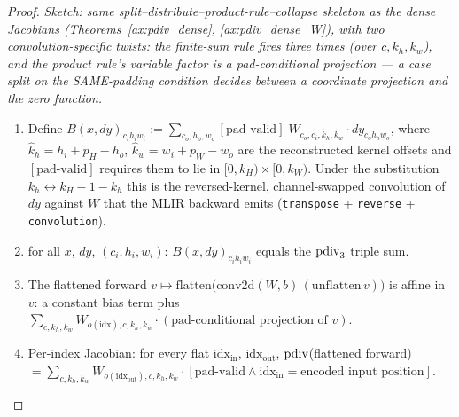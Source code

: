 \begin{proof}
\leanok
\emph{Sketch: same split--distribute--product-rule--collapse skeleton
as the dense Jacobians (Theorems~\ref{ax:pdiv_dense},
\ref{ax:pdiv_dense_W}), with two convolution-specific twists: the
finite-sum rule fires three times (over \(c, k_h, k_w\)), and the
product rule's variable factor is a pad-conditional projection
--- a case split on the SAME-padding condition decides between a
coordinate projection and the zero function.}
\begin{enumerate}
  \item Define \(B(x, dy)_{c_i h_i w_i} :=
    \sum_{c_o, h_o, w_o} [\text{pad-valid}]\;
      W_{c_o, c_i, \hat{k}_h, \hat{k}_w} \cdot dy_{c_o h_o w_o}\),
    where \(\hat{k}_h = h_i + p_H - h_o\),
    \(\hat{k}_w = w_i + p_W - w_o\) are the reconstructed kernel
    offsets and \([\text{pad-valid}]\) requires them to lie in
    \([0, k_H) \times [0, k_W)\). Under the substitution
    \(k_h \leftrightarrow k_H - 1 - k_h\) this is the reversed-kernel,
    channel-swapped convolution of \(dy\) against \(W\) that the MLIR
    backward emits (\texttt{transpose} + \texttt{reverse} +
    \texttt{convolution}).
  \item \Suffices{} for all \(x\), \(dy\), \((c_i, h_i, w_i)\):
    \(B(x, dy)_{c_i h_i w_i}\) equals the \(\operatorname{pdiv}_3\) triple sum.
  \item The flattened forward
    \(v \mapsto \mathrm{flatten}\bigl(\mathrm{conv2d}(W, b)\,
      (\mathrm{unflatten}\, v)\bigr)\)
    is affine in \(v\): a constant bias term plus
    \(\sum_{c, k_h, k_w} W_{o(\mathrm{idx}), c, k_h, k_w} \cdot
      (\text{pad-conditional projection of } v)\).
  \item Per-index Jacobian: for every flat \(\mathrm{idx_{in}}\),
    \(\mathrm{idx_{out}}\),
    \(\operatorname{pdiv}\)(flattened forward) \(=
      \sum_{c, k_h, k_w} W_{o(\mathrm{idx_{out}}), c, k_h, k_w} \cdot
      [\text{pad-valid} \wedge \mathrm{idx_{in}} =
        \text{encoded input position}]\).
\end{enumerate}
\end{proof}
